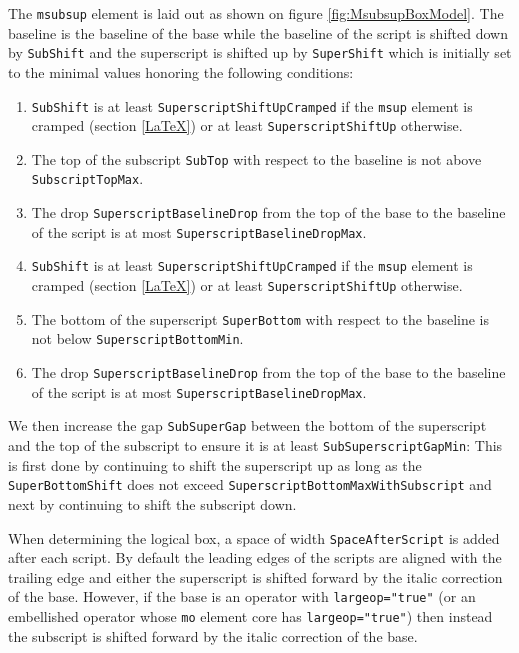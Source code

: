The {\tt msubsup} element is laid out as shown on figure
\ref{fig:MsubsupBoxModel}.
The baseline is the baseline of the base while the baseline of the script is
shifted down by {\tt SubShift} and the superscript is shifted up by
{\tt SuperShift} which is initially set to the minimal values honoring the
following conditions:
\begin{enumerate}
\item {\tt SubShift} is at least
  {\tt SuperscriptShiftUpCramped} if the {\tt msup} element is
  cramped (section \ref{LaTeX}) or at least
  {\tt SuperscriptShiftUp} otherwise.
\item The top of the subscript {\tt SubTop} with respect to the baseline
  is not above {\tt SubscriptTopMax}.
\item The drop {\tt SuperscriptBaselineDrop} from the top of the base to
  the baseline of the script is at most {\tt SuperscriptBaselineDropMax}.
\item {\tt SubShift} is at least
  {\tt SuperscriptShiftUpCramped} if the {\tt msup} element is
  cramped (section \ref{LaTeX}) or at least
  {\tt SuperscriptShiftUp} otherwise.
\item The bottom of the superscript {\tt SuperBottom} with respect to the
  baseline is not below {\tt SuperscriptBottomMin}.
\item The drop {\tt SuperscriptBaselineDrop} from the top of the base to
  the baseline of the script is at most {\tt SuperscriptBaselineDropMax}.
\end{enumerate}

We then increase the gap {\tt SubSuperGap} between the bottom of the superscript
and the top of the subscript to ensure it is at least
{\tt SubSuperscriptGapMin}:
This is first done by continuing to shift the superscript up as long as the
{\tt SuperBottomShift} does not exceed
{\tt SuperscriptBottomMaxWithSubscript}
and next by continuing to shift the subscript down.

When determining
the logical box, a space of width {\tt SpaceAfterScript}
is added after
each script. By default the leading edges of the scripts are aligned with
the trailing edge and either the superscript is shifted forward by the italic
correction of the base. However, if the base is an operator with
{\tt largeop="true"} (or an embellished operator whose {\tt mo} element core
has {\tt largeop="true"}) then instead the subscript is shifted forward by the
italic correction of the base.

